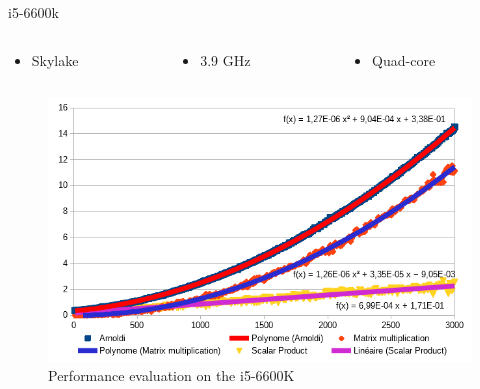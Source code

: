 \documentclass{beamer}
\begin{document}
\begin{frame}{i5-6600k}
\begin{columns}
\begin{column}{0.3\linewidth}
\begin{itemize}
\item Skylake
\end{itemize}
\end{column}
\begin{column}{0.3\linewidth}
\begin{itemize}
\item 3.9 GHz
\end{itemize}
\end{column}
\begin{column}{0.3\linewidth}
\begin{itemize}
\item Quad-core
\end{itemize}
\end{column}
\end{columns}
\begin{figure}
\includegraphics[width=0.82\linewidth]{i5-6600K.png}
\caption{Performance evaluation on the i5-6600K}
\end{figure}
\end{frame}
\end{document}
